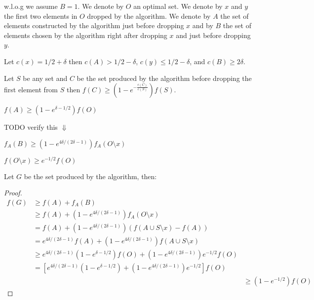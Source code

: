 w.l.o.g we assume $B = 1$.
We denote by $O$ an optimal set. 
We denote by $x$ and $y$ the first two elements in $O$ dropped by the algorithm.  
We denote by $A$ the set of elements constructed by the algorithm just before
dropping $x$ and by $B$ the set of elements chosen by the algorithm right after dropping $x$ 
and just before dropping $y$.

\begin{figure}[h]
\end{figure}

Let $c(x) = 1/2 + \delta$ 
then $c(A) > 1/2 - \delta$, $c(y) \leq 1/2 - \delta$, and $c(B) \geq 2\delta$.

\begin{lemma}
Let $S$ be any set and $C$ be the set produced by the algorithm 
before dropping the first element from $S$ then $f(C) \geq (1 - e^{-\frac{c(C)}{c(S)}})f(S)$.  
\end{lemma} 

\begin{observation}
$f(A) \geq (1 - e^{\delta - 1/2})f(O)$
\end{observation}

TODO verify this $\Downarrow$
\begin{observation}
$f_A(B) \geq (1 - e^{4\delta / (2\delta - 1)})f_A(O \setminus x)$
\end{observation}

\begin{observation}
$f(O \setminus x) \geq e^{-1/2}f(O)$
\end{observation}

Let $G$ be the set produced by the algorithm, then:
\begin{proof}
\def\arraystretch{1.5}
$$
\begin{array}{lll}
% 
f(G) & \geq f(A) + f_A(B)
\\& \geq f(A) + (1 - e^{4\delta / (2\delta - 1)})f_A(O \setminus x)
\\& = f(A) + (1 - e^{4\delta / (2\delta - 1)})(f(A \cup S \setminus x) - f(A))
\\& = e^{4\delta / (2\delta - 1)}f(A) 
	+ (1 - e^{4\delta / (2\delta - 1)})f(A \cup S \setminus x)
\\& \geq e^{4\delta / (2\delta - 1)}(1 - e^{\delta - 1/2})f(O)
	+ (1 - e^{4\delta / (2\delta - 1)})e^{-1/2}f(O)
\\& = [
		e^{4\delta / (2\delta - 1)}(1 - e^{\delta - 1/2}) + (1 - e^{4\delta / (2\delta - 1)})e^{-1/2}
		]f(O)
\\&& \geq (1-e^{-1/2})f(O)
% 
\end{array}
$$
\end{proof}